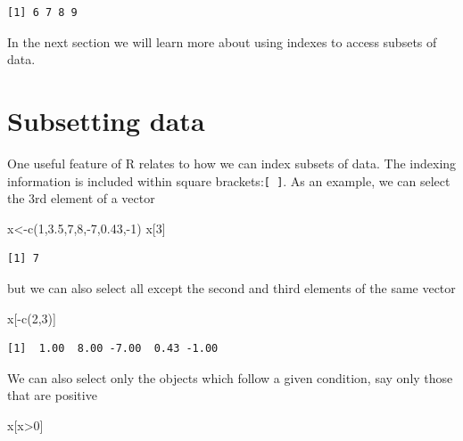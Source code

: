 \documentclass[
  letterpaper,
  DIV=11,
  numbers=noendperiod]{scrartcl}
\newenvironment{Shaded}{\begin{snugshade}}{\end{snugshade}}
\newcommand{\DecValTok}[1]{\textcolor[rgb]{0.68,0.00,0.00}{#1}}
\newcommand{\FloatTok}[1]{\textcolor[rgb]{0.68,0.00,0.00}{#1}}
\newcommand{\FunctionTok}[1]{\textcolor[rgb]{0.28,0.35,0.67}{#1}}
\newcommand{\NormalTok}[1]{\textcolor[rgb]{0.00,0.23,0.31}{#1}}
\newcommand{\OtherTok}[1]{\textcolor[rgb]{0.00,0.23,0.31}{#1}}
\newcommand{\SpecialCharTok}[1]{\textcolor[rgb]{0.37,0.37,0.37}{#1}}
\begin{document}
\begin{verbatim}
[1] 6 7 8 9
\end{verbatim}

In the next section we will learn more about using indexes to access
subsets of data.

\section{Subsetting data}\label{subsetting-data}

One useful feature of R relates to how we can index subsets of data. The
indexing information is included within square
brackets:\texttt{{[}\ {]}}. As an example, we can select the 3rd element
of a vector

\begin{Shaded}
\begin{Highlighting}[]
\NormalTok{x}\OtherTok{\textless{}{-}}\FunctionTok{c}\NormalTok{(}\DecValTok{1}\NormalTok{,}\FloatTok{3.5}\NormalTok{,}\DecValTok{7}\NormalTok{,}\DecValTok{8}\NormalTok{,}\SpecialCharTok{{-}}\DecValTok{7}\NormalTok{,}\FloatTok{0.43}\NormalTok{,}\SpecialCharTok{{-}}\DecValTok{1}\NormalTok{)}
\NormalTok{x[}\DecValTok{3}\NormalTok{]}
\end{Highlighting}
\end{Shaded}

\begin{verbatim}
[1] 7
\end{verbatim}

but we can also select all except the second and third elements of the
same vector

\begin{Shaded}
\begin{Highlighting}[]
\NormalTok{x[}\SpecialCharTok{{-}}\FunctionTok{c}\NormalTok{(}\DecValTok{2}\NormalTok{,}\DecValTok{3}\NormalTok{)]}
\end{Highlighting}
\end{Shaded}

\begin{verbatim}
[1]  1.00  8.00 -7.00  0.43 -1.00
\end{verbatim}

We can also select only the objects which follow a given condition, say
only those that are positive

\begin{Shaded}
\begin{Highlighting}[]
\NormalTok{x[x}\SpecialCharTok{\textgreater{}}\DecValTok{0}\NormalTok{]}
\end{Highlighting}
\end{Shaded}
\end{document}
